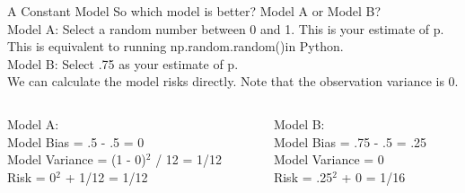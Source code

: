 \documentclass[aspectratio=169]{../latex_main/tntbeamer}  %
\begin{document}
	
	\begin{frame}[c]{A Constant Model}
	    So which model is better? Model A or Model B?\\
	    \bigskip
	    Model A: Select a random number between 0 and 1. This is your estimate of p. This is equivalent to running np.random.random()in Python.\\
        Model B: Select .75 as your estimate of p.\\
        \bigskip
        We can calculate the model risks directly. Note that the observation variance is 0.
        \begin{columns}
            \begin{column}{.4\textwidth}
                  Model A:\\
                  \bigskip
                  Model Bias = .5 - .5 = 0\\
                  Model Variance = (1 - 0)$^2$ / 12 = 1/12\\
                  \bigskip
                  Risk = 0$^2$ + 1/12 = 1/12
            \end{column}
            
            
            \begin{column}{.4\textwidth}
                   Model B:\\
                  \bigskip
                  Model Bias = .75 - .5 = .25\\
                  Model Variance = 0\\

                  \bigskip
                  Risk = .25$^2$ + 0 = 1/16
 
            \end{column}
        \end{columns}

	\end{frame}
\end{document}
